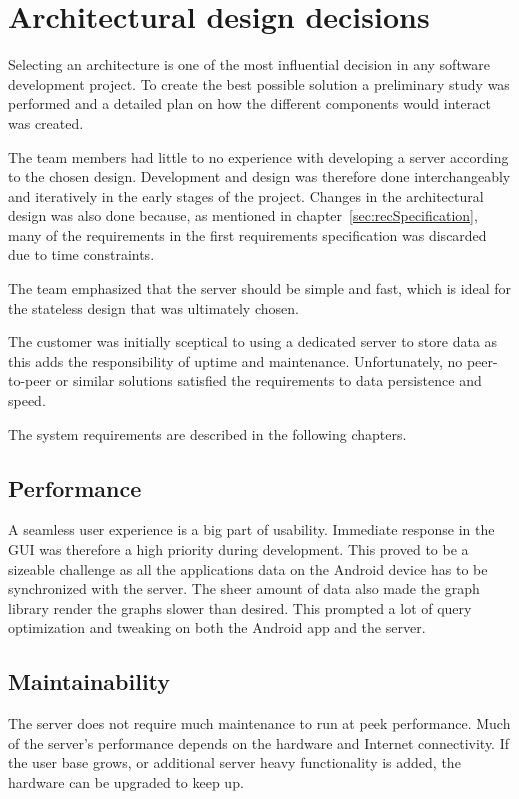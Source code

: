 \section{Architectural design decisions}
\label{sec:arch_design}
Selecting an architecture is one of the most influential decision in any software development project. To create the best possible solution a preliminary study was performed and a detailed plan on how the different components would interact was created. 

The team members had little to no experience with developing a server according to the chosen design. Development and design was therefore done interchangeably and iteratively in the early stages of the project. Changes in the architectural design was also done because, as mentioned in chapter~\ref{sec:recSpecification}, many of the requirements in the first requirements specification was discarded due to time constraints.

The team emphasized that the server should be simple and fast, which is ideal for the stateless design that was ultimately chosen. 

The customer was initially sceptical to using a dedicated server to store data as this adds the responsibility of uptime and maintenance. Unfortunately, no peer-to-peer or similar solutions satisfied the requirements to data persistence and speed.

The system requirements are described in the following chapters.

\subsection{Performance}
A seamless user experience is a big part of usability. Immediate response in the GUI was therefore a high priority during development. This proved to be a sizeable challenge as all the applications data on the Android device has to be synchronized with the server. 
The sheer amount of data also made the graph library render the graphs slower than desired. This prompted a lot of query optimization and tweaking on both the Android app and the server. 

\subsection{Maintainability}
The server does not require much maintenance to run at peek performance. Much of the server's performance depends on the hardware and Internet connectivity. If the user base grows, or additional server heavy functionality is added, the hardware can be upgraded to keep up.

